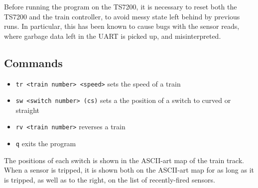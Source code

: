 Before running the program on the TS7200, it is necessary to reset both
the TS7200 and the train controller, to avoid messy state left behind by
previous runs. In particular, this has been known to cause bugs with the
sensor reads, where garbage data left in the UART is picked up, and
misinterpreted.

\subsection{Commands}\label{commands}

\begin{itemize}
\itemsep1pt\parskip0pt
\item
  \texttt{tr \textless{}train number\textgreater{} \textless{}speed\textgreater{}}
  sets the speed of a train
\item
  \texttt{sw \textless{}switch number\textgreater{} (c\textbar{}s)} sets
  a the position of a switch to curved or straight
\item
  \texttt{rv \textless{}train number\textgreater{}} reverses a train
\item
  \texttt{q} exits the program
\end{itemize}

The positions of each switch is shown in the ASCII-art map of the train
track. When a sensor is tripped, it is shown both on the ASCII-art map
for as long as it is tripped, as well as to the right, on the list of
recently-fired sensors.
